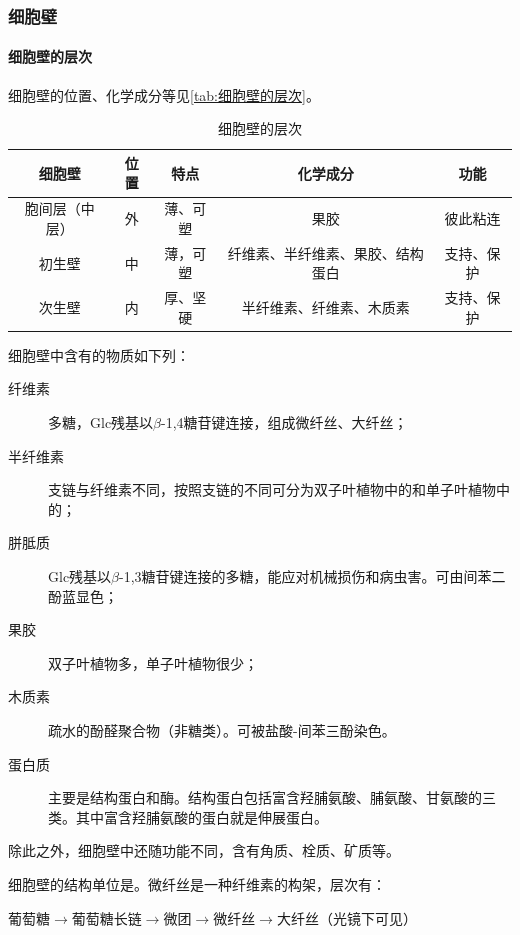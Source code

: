 	\subsubsection{细胞壁}
	
	\paragraph{细胞壁的层次}
	
	细胞壁的位置、化学成分等见\autoref{tab:细胞壁的层次}。
	
\begin{table}[htbp]
	\centering
	\begin{tabularx}{\textwidth}{|c|c|c|C|c|}
		\hline
		\textbf{细胞壁} & \textbf{位置} & \textbf{特点} & \textbf{化学成分} & \textbf{功能} \\ \hline
		胞间层（中层） & 外 & 薄、可塑 & 果胶 & 彼此粘连 \\ \hline
		初生壁 & 中 & 薄，可塑 & 纤维素、半纤维素、果胶、结构蛋白 & 支持、保护 \\ \hline
		次生壁 & 内 & 厚、坚硬 & 半纤维素、纤维素、木质素 & 支持、保护 \\ \hline
	\end{tabularx}
	\caption{细胞壁的层次}
	\label{tab:细胞壁的层次}
\end{table}
	
	细胞壁中含有的物质如下列：
	\begin{description}
		\item[纤维素] 多糖，Glc残基以$\beta$-1,4糖苷键连接，组成微纤丝、大纤丝；
		\item[半纤维素] 支链与纤维素不同，按照支链的不同可分为双子叶植物中的和单子叶植物中的；
		\item[胼胝质] Glc残基以$\beta$-1,3糖苷键连接的多糖，能应对机械损伤和病虫害。可由间苯二酚蓝显色；
		\item[果胶] 双子叶植物多，单子叶植物很少；
		\item[木质素] 疏水的酚醛聚合物（非糖类）。可被盐酸-间苯三酚染色。
		\item[蛋白质] 主要是结构蛋白和酶。结构蛋白包括富含羟脯氨酸、脯氨酸、甘氨酸的三类。其中富含羟脯氨酸的蛋白就是伸展蛋白。
	\end{description}
	
	除此之外，细胞壁中还随功能不同，含有角质、栓质、矿质等。
	
	细胞壁的结构单位是。微纤丝是一种纤维素的构架，层次有：
	\begin{center}
		葡萄糖$\longrightarrow$葡萄糖长链$\longrightarrow$微团$\longrightarrow$微纤丝$\longrightarrow$大纤丝（光镜下可见）
	\end{center}
	
